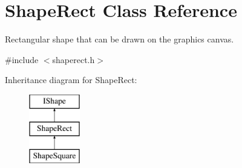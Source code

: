 \hypertarget{class_shape_rect}{}\section{Shape\+Rect Class Reference}
\label{class_shape_rect}


Rectangular shape that can be drawn on the graphics canvas.  




{\ttfamily \#include $<$shaperect.\+h$>$}

Inheritance diagram for Shape\+Rect\+:\begin{figure}[H]
\begin{center}
\leavevmode
\includegraphics[height=3.000000cm]{class_shape_rect}
\end{center}
\end{figure}
